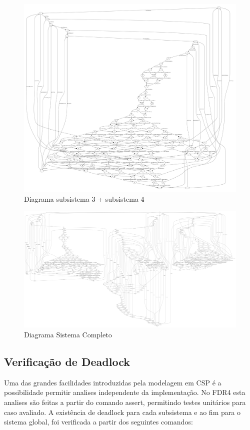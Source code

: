 \documentclass[a4paper,11pt,twocolumns]{article}
\begin{document}
\newpage
\begin{figure}[H]
    \centering
    \includegraphics[width = \linewidth]{./img/g_sistema12.pdf}
    \caption{Diagrama subsistema 3 + subsistema 4}
    \label{fig:g_subsis34}
\end{figure}


\newpage
\begin{landscape}
\begin{figure}[H]
    \centering
    \includegraphics[width = \linewidth]{./img/g_sistema.pdf}
    \caption{Diagrama Sistema Completo}
    \label{fig:g_sistema}
\end{figure}
\end{landscape}

\subsection{Verificação de Deadlock}
Uma das grandes facilidades introduzidas pela modelagem em CSP é a possibilidade permitir analises independente da implementação\cite{car.hoare}. No FDR4 esta analises são feitas a partir do comando assert, permitindo testes unitários para caso avaliado. A existência de deadlock para cada subsistema e ao fim para o sistema global, foi verificada a partir dos seguintes comandos:
\end{document}
